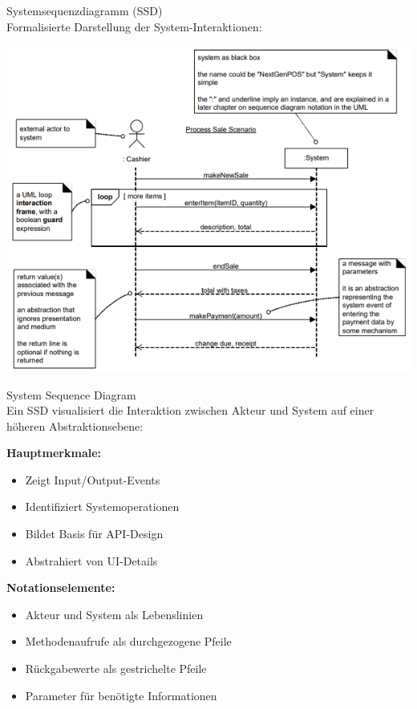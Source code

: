 \begin{definition}{Systemsequenzdiagramm (SSD)}\\
Formalisierte Darstellung der System-Interaktionen:

\includegraphics[width=\linewidth]{images/ssd.png}
\end{definition}

\begin{concept}{System Sequence Diagram}\\
Ein SSD visualisiert die Interaktion zwischen Akteur und System auf einer höheren Abstraktionsebene:

\textbf{Hauptmerkmale:}
\begin{itemize}
    \item Zeigt Input/Output-Events
    \item Identifiziert Systemoperationen
    \item Bildet Basis für API-Design
    \item Abstrahiert von UI-Details
\end{itemize}

\textbf{Notationselemente:}
\begin{itemize}
    \item Akteur und System als Lebenslinien
    \item Methodenaufrufe als durchgezogene Pfeile
    \item Rückgabewerte als gestrichelte Pfeile
    \item Parameter für benötigte Informationen
\end{itemize}
\end{concept}

